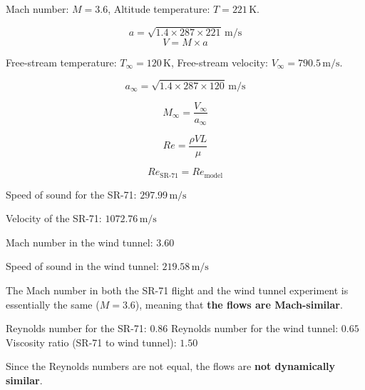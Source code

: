  

%
%

\newcommand{\hmwkTitle}{Homework 02}
\newcommand{\hmwkDueDate}{September 27, 2024}
\newcommand{\hmwkDueTime}{05:00 PM}
\newcommand{\hmwkClass}{ENAE 311H}
\newcommand{\hmwkClassTime}{Section 0101}
\newcommand{\hmwkClassInstructor}{Dr. Brehm}
\newcommand{\hmwkAuthorName}{\textbf{Vai Srivastava}}
\newcommand{\hmwkCompletionDate}{September 27, 2024}



\maketitle

\pagebreak

\begin{homeworkProblem}

	Mach number: \(M = 3.6\),
	Altitude temperature: \(T = 221 \, \text{K}\).

	\[
		a = \sqrt{1.4 \times 287 \times 221} \, \text{m/s}
	\]
	\[
		V = M \times a
	\]

	Free-stream temperature: \(T_\infty = 120 \, \text{K}\),
	Free-stream velocity: \(V_\infty = 790.5 \, \text{m/s}\).

	\[
		a_\infty = \sqrt{1.4 \times 287 \times 120} \, \text{m/s}
	\]

	\[
		M_\infty = \frac{V_\infty}{a_\infty}
	\]

	\[
		Re = \frac{\rho V L}{\mu}
	\]

	\[
		Re_{\text{SR-71}} = Re_{\text{model}}
	\]

	Speed of sound for the SR-71: \(297.99 \, \text{m/s}\)

	Velocity of the SR-71: \(1072.76 \, \text{m/s}\)

	Mach number in the wind tunnel: \(3.60\)

	Speed of sound in the wind tunnel: \(219.58 \, \text{m/s}\)


	The Mach number in both the SR-71 flight and the wind tunnel experiment is essentially the same (\(M = 3.6\)), meaning that \textbf{the flows are Mach-similar}.


	Reynolds number for the SR-71: \(0.86\)
	Reynolds number for the wind tunnel: \(0.65\)
	Viscosity ratio (SR-71 to wind tunnel): \(1.50\)


	Since the Reynolds numbers are not equal, the flows are \textbf{not dynamically similar}.

\end{homeworkProblem}

